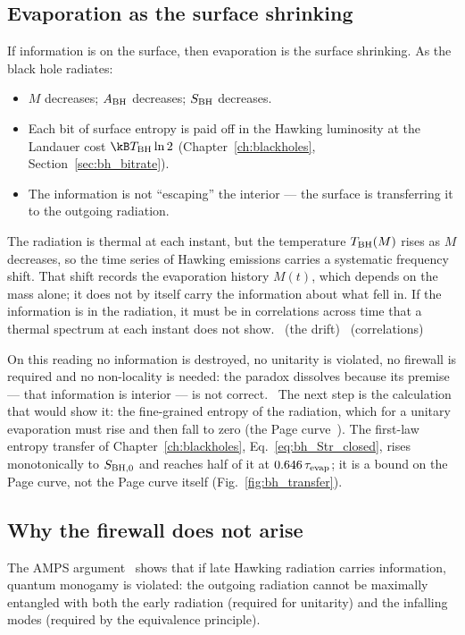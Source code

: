 \subsection{Evaporation as the surface shrinking}
If information is on the surface, then evaporation is the surface shrinking. As the black hole radiates:
\begin{itemize}
\item $M$ decreases; $A_{\rm BH}$ decreases; $S_{\rm BH}$ decreases.
\item Each bit of surface entropy is paid off in the Hawking luminosity at the Landauer cost $\kB T_{\rm BH}\ln2$ (Chapter~\ref{ch:blackholes}, Section~\ref{sec:bh_bitrate}).
\item The information is not ``escaping'' the interior --- the surface is transferring it to the outgoing radiation.
\end{itemize}
The radiation is thermal at each instant, but the temperature $T_{\rm BH}(M)$ rises as $M$ decreases, so the time series of Hawking emissions carries a systematic
frequency shift. That shift records the evaporation history $M(t)$, which depends on the mass alone; it does not by itself carry the information about what
fell in. If the information is in the radiation, it must be in correlations across time that a thermal spectrum at each instant does not show. \derived\ (the
drift) \conjecture\ (correlations)

On this reading no information is destroyed, no unitarity is violated, no firewall is required and no non-locality is needed: the paradox dissolves because
its premise --- that information is interior --- is not correct. \interp\ The next step is the calculation that would show it: the fine-grained entropy of the radiation, which for a unitary evaporation must rise and then fall to zero (the Page curve~\cite{Page1993}). The first-law entropy transfer
of Chapter~\ref{ch:blackholes}, Eq.~\eqref{eq:bh_Str_closed}, rises monotonically to $S_{\rm BH,0}$ and reaches half of it at $0.646\,\tau_{\rm evap}$; it is a bound on the Page curve,
not the Page curve itself (Fig.~\ref{fig:bh_transfer}). \openprob

\subsection{Why the firewall does not arise}
The AMPS argument~\cite{AMPS2013} shows that if late Hawking radiation carries information, quantum monogamy is violated: the outgoing radiation cannot be maximally
entangled with both the early radiation (required for unitarity) and the infalling modes (required by the equivalence principle).

